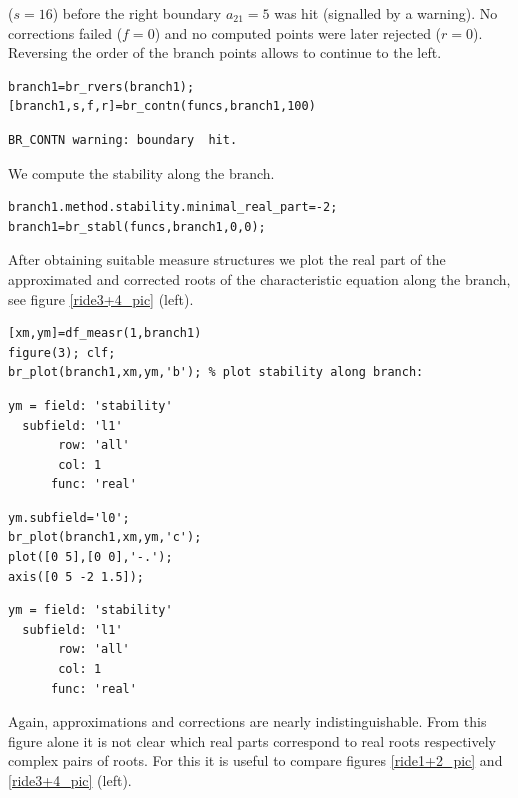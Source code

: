 \documentclass[10pt]{scrartcl}
\begin{document}
($s=16$) before the right boundary $a_{21}=5$ was hit (signalled by a
warning).  No corrections failed ($f=0$) and no computed points were
later rejected ($r=0$). Reversing the order of the branch points
allows to continue to the left.  
\begin{lstlisting}
branch1=br_rvers(branch1);
[branch1,s,f,r]=br_contn(funcs,branch1,100)  
\end{lstlisting}
{\small
\begin{verbatim} 
BR_CONTN warning: boundary  hit.
\end{verbatim}}
We compute the stability along the branch.
\begin{lstlisting}
branch1.method.stability.minimal_real_part=-2;
branch1=br_stabl(funcs,branch1,0,0);  
\end{lstlisting}
After obtaining suitable measure structures we plot the real part of
the approximated and corrected roots of the characteristic equation
along the branch, see figure \ref{ride3+4_pic} (left).  
\begin{lstlisting} 
[xm,ym]=df_measr(1,branch1) 
figure(3); clf;
br_plot(branch1,xm,ym,'b'); % plot stability along branch:
\end{lstlisting}
{\small
\begin{verbatim}
ym = field: 'stability'
  subfield: 'l1'
       row: 'all'
       col: 1
      func: 'real'
\end{verbatim}
}
\begin{lstlisting} 
ym.subfield='l0'; 
br_plot(branch1,xm,ym,'c');
plot([0 5],[0 0],'-.');
axis([0 5 -2 1.5]);
\end{lstlisting}
{\small
\begin{verbatim}
ym = field: 'stability'
  subfield: 'l1'
       row: 'all'
       col: 1
      func: 'real'
\end{verbatim}}
Again, approximations and 
corrections are nearly indistinguishable. From this figure alone it
is not clear which real parts correspond to real roots respectively
complex pairs of roots. For this it is 
useful to compare figures \ref{ride1+2_pic} and \ref{ride3+4_pic} (left).
\end{document}
